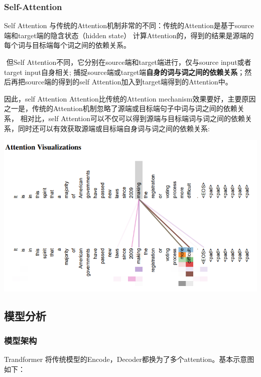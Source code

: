\documentclass[UTF8,a4paper,10pt]{ctexart}
\begin{document}
    
\subsubsection{Self-Attention}

Self Attention 与传统的Attention机制非常的不同：传统的Attention是基于source端和target端的隐含状态（hidden state）
计算Attention的，得到的结果是源端的每个词与目标端每个词之间的依赖关系。

​    但Self Attention不同，它分别在source端和target端进行，仅与source input或者target input自身相关;
捕捉source端或target端\textbf{自身的词与词之间的依赖关系}；然后再把source端的得到的self Attention加入到target端得到的Attention中。

 因此，self Attention Attention比传统的Attention mechanism效果要好，主要原因之一是，传统的Attention机制忽略了源端或目标端句子中词与词之间的依赖关系，
相对比，self Attention可以不仅可以得到源端与目标端词与词之间的依赖关系，同时还可以有效获取源端或目标端自身词与词之间的依赖关系:

\includegraphics[scale=0.7]{pics/190413-att.png}

\subsection{模型分析}

\subsubsection{模型架构}
Trandformer 将传统模型的Encode，Decoder都换为了多个attention。基本示意图如下：
\end{document}
